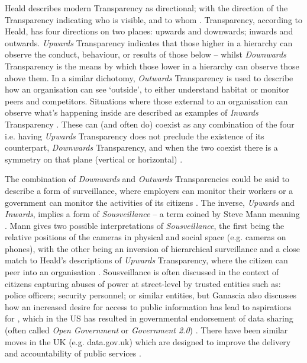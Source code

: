 Heald describes modern Transparency as directional; with the direction of the Transparency indicating who is visible, and to whom \cite{heald_varieties_2006}. Transparency, according to Heald, has four directions on two planes: upwards and downwards; inwards and outwards. \textit{Upwards} Transparency indicates that those higher in a hierarchy can observe the conduct, behaviour, or results of those below -- whilst \textit{Downwards} Transparency is the means by which those lower in a hierarchy can observe those above them. In a similar dichotomy, \textit{Outwards} Transparency is used to describe how an organisation can see `outside', to either understand habitat or monitor peers and competitors. Situations where those external to an organisation can observe what's happening inside are described as examples of \textit{Inwards} Transparency \cite{heald_varieties_2006}. These can (and often do) coexist as any combination of the four i.e. having \textit{Upwards} Transparency does not preclude the existence of its counterpart, \textit{Downwards} Transparency, and when the two coexist there is a symmetry on that plane (vertical or horizontal) \cite{heald_varieties_2006}.

The combination of \textit{Downwards} and \textit{Outwards} Transparencies could be said to describe a form of surveillance, where employers can monitor their workers or a government can monitor the activities of its citizens \cite{heald_varieties_2006}. The inverse, \textit{Upwards} and \textit{Inwards}, implies a form of \textit{Sousveillance} -- a term coined by Steve Mann meaning  \cite{mann_sousveillance:_2004}. Mann gives two possible interpretations of \textit{Sousveillance}, the first being the relative positions of the cameras in physical and social space (e.g. cameras on phones), with the other being an inversion of hierarchical surveillance and a close match to Heald's descriptions of \textit{Upwards} Transparency, where the citizen can peer into an organisation \cite{mann_sousveillance:_2004, heald_varieties_2006}. Sousveillance is often discussed in the context of citizens capturing abuses of power at street-level by trusted entities such as: police officers; security personnel; or similar entities, but Ganascia also discusses how an increased desire for access to public information has lead to aspirations for , which in the US has resulted in governmental endorsement of data sharing (often called \textit{Open Government} or \textit{Government 2.0}) \cite{ganascia_generalized_2010}. There have been similar moves in the UK (e.g. data.gov.uk) which are designed to improve the delivery and accountability of public services \cite{shadbolt_linked_2012}.

